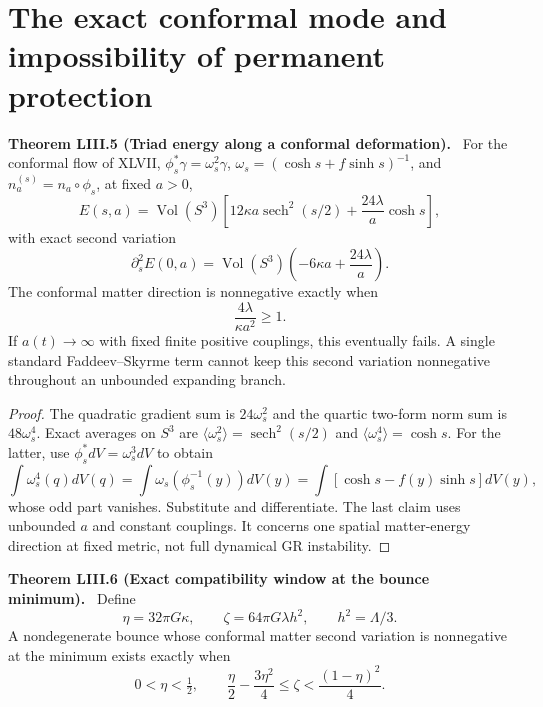 \documentclass[11pt,a4paper,oneside]{book}
\newcommand{\statement}[3]{\par\medskip\noindent\textbf{#1 #2 (#3).}\ }
\begin{document}
\section{The exact conformal mode and impossibility of permanent protection}
\statement{Theorem}{LIII.5}{Triad energy along a conformal deformation}
For the conformal flow of XLVII, $\phi_s^*\gamma=\omega_s^2\gamma$, $\omega_s=(\cosh s+f\sinh s)^{-1}$, and $n_a^{(s)}=n_a\circ\phi_s$, at fixed $a>0$,
\begin{equation}E(s,a)=\operatorname{Vol}(S^3)\left[12\kappa a\operatorname{sech}^2(s/2)+\frac{24\lambda}a\cosh s\right],\tag{300}\end{equation}
with exact second variation
\begin{equation}\partial_s^2E(0,a)=\operatorname{Vol}(S^3)\left(-6\kappa a+\frac{24\lambda}a\right).\tag{301}\end{equation}
The conformal matter direction is nonnegative exactly when
\begin{equation}\frac{4\lambda}{\kappa a^2}\ge1.\tag{302}\end{equation}
If $a(t)\to\infty$ with fixed finite positive couplings, this eventually fails. A single standard Faddeev--Skyrme term cannot keep this second variation nonnegative throughout an unbounded expanding branch.
\begin{proof}
The quadratic gradient sum is $24\omega_s^2$ and the quartic two-form norm sum is $48\omega_s^4$. Exact averages on $S^3$ are $\langle\omega_s^2\rangle=\operatorname{sech}^2(s/2)$ and $\langle\omega_s^4\rangle=\cosh s$. For the latter, use $\phi_s^*dV=\omega_s^3dV$ to obtain
\[\int\omega_s^4(q)dV(q)=\int\omega_s(\phi_s^{-1}(y))dV(y)=\int[\cosh s-f(y)\sinh s]dV(y),\]
whose odd part vanishes. Substitute and differentiate. The last claim uses unbounded $a$ and constant couplings. It concerns one spatial matter-energy direction at fixed metric, not full dynamical GR instability.
\end{proof}
\statement{Theorem}{LIII.6}{Exact compatibility window at the bounce minimum}
Define
\begin{equation}\eta=32\pi G\kappa,\qquad\zeta=64\pi G\lambda h^2,\qquad h^2=\Lambda/3.\tag{303}\end{equation}
A nondegenerate bounce whose conformal matter second variation is nonnegative at the minimum exists exactly when
\begin{equation}0<\eta<\tfrac12,\qquad\frac\eta2-\frac{3\eta^2}4\le\zeta<\frac{(1-\eta)^2}4.\tag{304}\end{equation}
\end{document}

